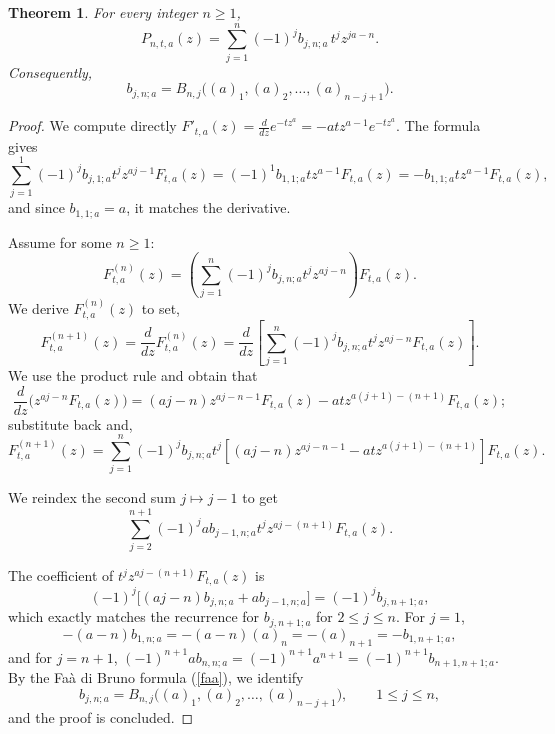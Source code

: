 \documentclass[a4paper,12pt]{amsart}
\newtheorem{theorem}[thm]{Theorem}
\theoremstyle{definition}
\theoremstyle{remark}
\begin{document}
\begin{theorem}\label{recur2}
For every integer $n\ge1$,
\begin{equation}
\label{mainformula}
P_{n,t,a}(z)=
\sum_{j=1}^{n}
(-1)^{j}b_{j,n;a}\,t^j z^{ja-n}.
\end{equation}
Consequently,
\[
b_{j,n;a}
=
B_{n,j}\!\big( (a)_1, (a)_2, \dots, (a)_{n-j+1} \big).
\]
\end{theorem}
\begin{proof} We compute directly $
F'_{t,a}(z) = \frac{d}{dz} e^{-t z^a} = -a t z^{a-1} e^{-t z^a}.$
The formula gives
\[
\sum_{j=1}^{1} (-1)^{j} b_{j,1;a} t^j z^{aj - 1} F_{t,a}(z) = (-1)^{1} b_{1,1;a} t z^{a-1} F_{t,a}(z) = -b_{1,1;a} t z^{a-1} F_{t,a}(z),
\]
and since $b_{1,1;a} = a$, it matches the derivative.

Assume for some $n \ge 1$:
\[
F^{(n)}_{t,a}(z) = \left( \sum_{j=1}^{n} (-1)^{j} b_{j,n;a} t^j z^{aj - n} \right) F_{t,a}(z).
\]
We derive $F^{(n)}_{t,a}(z)$ to set,
\[
F^{(n+1)}_{t,a}(z) = \frac{d}{dz} F^{(n)}_{t,a}(z)
= \frac{d}{dz} \left[ \sum_{j=1}^{n} (-1)^{j} b_{j,n;a} t^j z^{aj - n} F_{t,a}(z) \right].
\]
We use the product rule and obtain that
\[
\frac{d}{dz} \big( z^{aj - n} F_{t,a}(z) \big)
= (aj - n) z^{aj - n - 1} F_{t,a}(z) - a t z^{a(j+1) - (n+1)} F_{t,a}(z);
\]
substitute back and,
\[
F^{(n+1)}_{t,a}(z) = \sum_{j=1}^{n} (-1)^{j} b_{j,n;a} t^j \left[ (aj - n) z^{aj - n - 1} - a t z^{a(j+1) - (n+1)} \right] F_{t,a}(z).
\]

We reindex the second sum \(j \mapsto j-1\) to get
\[
\sum_{j=2}^{n+1} (-1)^{j} a b_{j-1,n;a} t^j z^{aj - (n+1)} F_{t,a}(z).
\]



The coefficient of \(t^j z^{aj - (n+1)} F_{t,a}(z)\) is
\[
(-1)^{j} \big[ (aj - n) b_{j,n;a} + a b_{j-1,n;a} \big] = (-1)^{j} b_{j,n+1;a},
\]
which exactly matches the recurrence for \(b_{j,n+1;a}\) for $2\le j\le n$. For $j=1$, $$-(a-n)b_{1,n;a}= -(a-n)(a)_n=-(a)_{n+1}= -b_{1,n+1;a},
$$
and for $j=n+1$, $(-1)^{n+1}a b_{n,n;a}= (-1)^{n+1}a^{n+1}= (-1)^{n+1}b_{n+1,n+1;a}$.  By the Fa\`a di Bruno formula (\ref{faa}), we identify
$$
b_{j,n;a}
=
B_{n,j}\!\big( (a)_1, (a)_2, \dots, (a)_{n-j+1} \big), \qquad 1\le j\le n,
$$
and the proof is concluded.
\end{proof}
\end{document}
